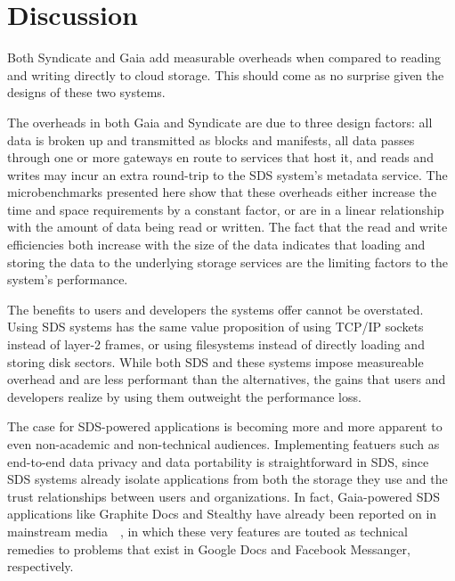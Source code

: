 \section{Discussion}

Both Syndicate and Gaia add measurable overheads when compared to reading and
writing directly to cloud storage.  This should come as no surprise given the
designs of these two systems.

The overheads in both Gaia and Syndicate are due to three design factors:
all data is broken up and transmitted as blocks and manifests, all data
passes through one or more gateways en route to services that host it, and reads
and writes may incur an extra round-trip to the SDS system's metadata service.
The microbenchmarks presented here show that these overheads either increase the
time and space requirements by a constant factor, or are in a linear
relationship with the amount of data being read or written.  The fact that
the read and write efficiencies both increase with the size of the data indicates
that loading and storing the data to the underlying storage services are the
limiting factors to the system's performance.

The benefits to users and developers the systems offer cannot be overstated.
Using SDS systems has the same value proposition of using TCP/IP sockets instead of
layer-2 frames, or using filesystems instead of directly loading and storing
disk sectors.  While both SDS and these systems impose measureable overhead
and are less performant than the alternatives, the gains that users and
developers realize by using them outweight the performance loss.

The case for SDS-powered applications is becoming more and more apparent to even
non-academic and non-technical audiences.  Implementing featuers such as
end-to-end data privacy and data portability is straightforward in SDS, since
SDS systems already isolate applications from both the storage they use and the
trust relationships between users and organizations.  In fact, Gaia-powered SDS
applications like Graphite Docs and Stealthy have already been reported on in
mainstream media~\cite{graphite-wired}~\cite{washington-post-blockstack}, in
which these very features are touted as technical remedies to problems that
exist in Google Docs and Facebook Messanger, respectively.
